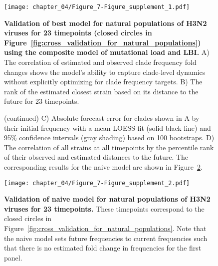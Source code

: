 \begin{figure}
  \texttt{[image: chapter\_04/Figure\_7-Figure\_supplement\_1.pdf]}
  \caption[{Validation of best model for natural populations of H3N2 viruses for 23 timepoints (closed circles in Figure~\ref{fig:cross_validation_for_natural_populations}) using the composite model of mutational load and LBI.}]{
    {\bf Validation of best model for natural populations of H3N2 viruses for 23 timepoints (closed circles in Figure~\ref{fig:cross_validation_for_natural_populations}) using the composite model of mutational load and LBI.}
    A) The correlation of estimated and observed clade frequency fold changes shows the model's ability to capture clade-level dynamics without explicitly optimizing for clade frequency targets.
    B) The rank of the estimated closest strain based on its distance to the future for 23 timepoints.
  }
  \label{fig:validation_of_best_model_for_natural_populations}
\end{figure}

\begin{figure}\ContinuedFloat
  \caption[{}]{(continued)
    C) Absolute forecast error for clades shown in A by their initial frequency with a mean LOESS fit (solid black line) and 95\% confidence intervals (gray shading) based on 100 bootstraps.
    D) The correlation of all strains at all timepoints by the percentile rank of their observed and estimated distances to the future.
    The corresponding results for the naive model are shown in Figure~\ref{fig:validation_of_naive_model_for_natural_populations}.
  }
\end{figure}

\begin{figure}
  \texttt{[image: chapter\_04/Figure\_7-Figure\_supplement\_2.pdf]}
  \caption[{Validation of naive model for natural populations of H3N2 viruses for 23 timepoints.}]{
    {\bf Validation of naive model for natural populations of H3N2 viruses for 23 timepoints.}
    These timepoints correspond to the closed circles in Figure~\ref{fig:cross_validation_for_natural_populations}.
    Note that the naive model sets future frequencies to current frequencies such that there is no estimated fold change in frequencies for the first panel.
  }
  \label{fig:validation_of_naive_model_for_natural_populations}
\end{figure}

